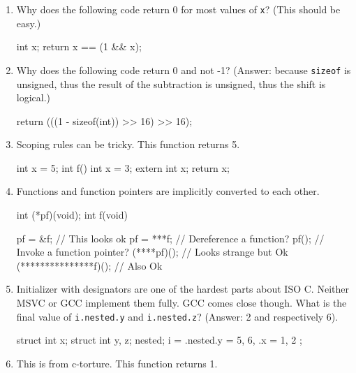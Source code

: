 \documentclass[letterpaper]{article}
\def\t#1{{\tt #1}}
\begin{document}
\begin{enumerate}

\item Why does the following code return 0 for most values of \t{x}? (This
should be easy.)

\begin{cilcode}[local]
  int x;
  return x == (1 && x);
\end{cilcode}

\item Why does the following code return 0 and not -1? (Answer: because
\t{sizeof} is unsigned, thus the result of the subtraction is unsigned, thus
the shift is logical.)

\begin{cilcode}[local]
 return (((1 - sizeof(int)) >> 16) >> 16);
\end{cilcode}

\item Scoping rules can be tricky. This function returns 5.

\begin{cilcode}[global]
int x = 5;
int f() {
  int x = 3;
  {
    extern int x;
    return x;
  }
}
\end{cilcode}

\item Functions and function pointers are implicitly converted to each other. 

\begin{cilcode}[global]
int (*pf)(void);
int f(void) {

   pf = &f; // This looks ok
   pf = ***f; // Dereference a function?
   pf(); // Invoke a function pointer?     
   (****pf)();  // Looks strange but Ok
   (***************f)(); // Also Ok             
}
\end{cilcode}

\item Initializer with designators are one of the hardest parts about ISO C.
Neither MSVC or GCC implement them fully. GCC comes close though. What is the
final value of \t{i.nested.y} and \t{i.nested.z}? (Answer: 2 and respectively
6). 

\begin{cilcode}[global]
struct { 
   int x; 
   struct { 
       int y, z; 
   } nested;
} i = { .nested.y = 5, 6, .x = 1, 2 };               
\end{cilcode}

\item This is from c-torture. This function returns 1.


\end{enumerate}
\end{document}
